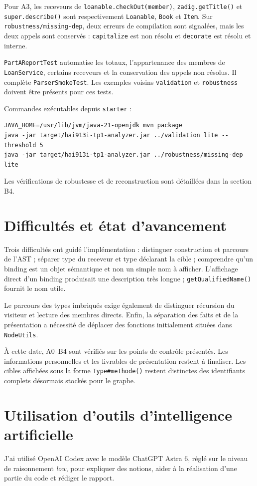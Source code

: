 \documentclass[11pt,a4paper]{article}
\newcommand{\code}[1]{\texttt{#1}}
\begin{document}
Pour A3, les receveurs de \code{loanable.checkOut(member)}, \code{zadig.getTitle()} et \code{super.describe()} sont respectivement \code{Loanable}, \code{Book} et \code{Item}. Sur \code{robustness/missing-dep}, deux erreurs de compilation sont signalées, mais les deux appels sont conservés : \code{capitalize} est non résolu et \code{decorate} est résolu et interne.

\code{PartAReportTest} automatise les totaux, l'appartenance des membres de \code{LoanService}, certains receveurs et la conservation des appels non résolus. Il complète \code{ParserSmokeTest}. Les exemples voisins \code{validation} et \code{robustness} doivent être présents pour ces tests.

Commandes exécutables depuis \code{starter} :
\begin{lstlisting}
JAVA_HOME=/usr/lib/jvm/java-21-openjdk mvn package
java -jar target/hai913i-tp1-analyzer.jar ../validation lite --threshold 5
java -jar target/hai913i-tp1-analyzer.jar ../robustness/missing-dep lite
\end{lstlisting}
Les vérifications de robustesse et de reconstruction sont détaillées dans la section B4.

\section{Difficultés et état d'avancement}
Trois difficultés ont guidé l'implémentation : distinguer construction et parcours de l'AST ; séparer type du receveur et type déclarant la cible ; comprendre qu'un binding est un objet sémantique et non un simple nom à afficher. L'affichage direct d'un binding produisait une description très longue ; \code{getQualifiedName()} fournit le nom utile.

Le parcours des types imbriqués exige également de distinguer récursion du visiteur et lecture des membres directs. Enfin, la séparation des faits et de la présentation a nécessité de déplacer des fonctions initialement situées dans \code{NodeUtils}.

À cette date, A0--B4 sont vérifiés sur les points de contrôle présentés. Les informations personnelles et les livrables de présentation restent à finaliser. Les cibles affichées sous la forme \code{Type\#methode()} restent distinctes des identifiants complets désormais stockés pour le graphe.

\section{Utilisation d'outils d'intelligence artificielle}
J'ai utilisé OpenAI Codex avec le modèle ChatGPT Astra 6, réglé sur le niveau de raisonnement \emph{low}, pour expliquer des notions, aider à la réalisation d'une partie du code et rédiger le rapport.
\end{document}
